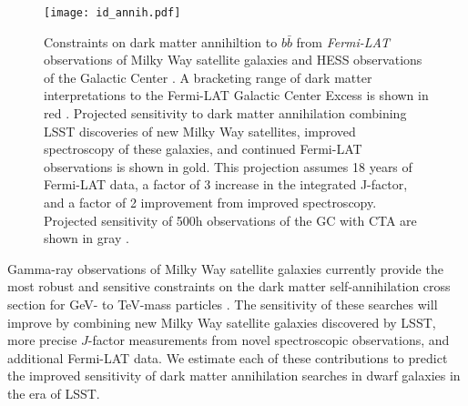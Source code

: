 \begin{figure}[t]
\centering
\texttt{[image: id\_annih.pdf]}
\caption{Constraints on dark matter annihiltion to $b\bar{b}$ from {\it Fermi-LAT} observations of Milky Way satellite galaxies \citep[LAT Dwarfs;][]{} and HESS observations of the Galactic Center \citep[HESS GC;][]{1607.08142}. 
A bracketing range of dark matter interpretations to the  Fermi-LAT Galactic Center Excess is shown in red \citep[GCE;][]{1402.6703, Gordon:2013, Abazajian:2014}.
Projected sensitivity to dark matter annihilation combining LSST discoveries of new Milky Way satellites, improved spectroscopy of these galaxies, and continued Fermi-LAT observations is shown in gold. This projection assumes 18 years of Fermi-LAT data, a factor of 3 increase in the integrated J-factor, and a factor of 2 improvement from improved spectroscopy. 
Projected sensitivity of 500h observations of the GC with CTA are shown in gray \citep[CTA GC;][]{Zaharijas:prep}.
\label{fig:indirect}
}
\end{figure}

Gamma-ray observations of Milky Way satellite galaxies currently provide the most robust and sensitive constraints on the dark matter self-annihilation cross section for GeV- to TeV-mass particles \citep[\eg][]{Ackermann:2014, Geringer-Sameth:2015, Ackermann:2015}.
The sensitivity of these searches will improve by combining new Milky Way satellite galaxies discovered by LSST, more precise $J$-factor measurements from novel spectroscopic observations, and additional Fermi-LAT data. 
We estimate each of these contributions to predict the improved sensitivity of dark matter annihilation searches in dwarf galaxies in the era of LSST.

